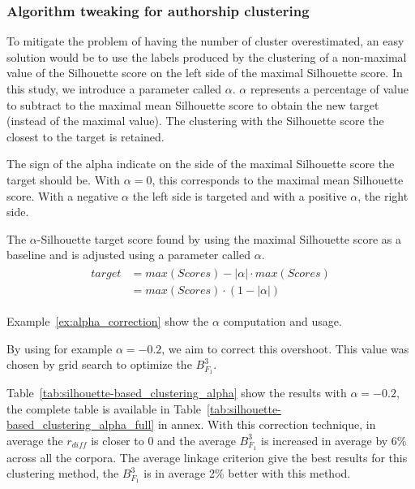 \subsubsection{Algorithm tweaking for authorship clustering}

To mitigate the problem of having the number of cluster overestimated, an easy solution would be to use the labels produced by the clustering of a non-maximal value of the Silhouette score on the left side of the maximal Silhouette score.
In this study, we introduce a parameter called $\alpha$.
$\alpha$ represents a percentage of value to subtract to the maximal mean Silhouette score to obtain the new target (instead of the maximal value).
The clustering with the Silhouette score the closest to the target is retained.

The sign of the alpha indicate on the side of the maximal Silhouette score the target should be.
With $\alpha = 0$, this corresponds to the maximal mean Silhouette score.
With a negative $\alpha$ the left side is targeted and with a positive $\alpha$, the right side.

\begin{definition}
  The $\alpha$-Silhouette target score found by using the maximal Silhouette score as a baseline and is adjusted using a parameter called $\alpha$.
  \begin{gather*}
    \begin{aligned}
    target &= max(Scores) - |\alpha| \cdot max(Scores) \\
           &= max(Scores) \cdot (1 - |\alpha|)
    \end{aligned}
  \end{gather*}
\end{definition}

Example~\ref{ex:alpha_correction} show the $\alpha$ computation and usage.

By using for example $\alpha = -0.2$, we aim to correct this overshoot.
This value was chosen by grid search to optimize the $B^3_{F_1}$.

Table~\ref{tab:silhouette-based_clustering_alpha} show the results with $\alpha = -0.2$, the complete table is available in Table~\ref{tab:silhouette-based_clustering_alpha_full} in annex.
With this correction technique, in average the $r_{diff}$ is closer to 0 and the average $B^3_{F_1}$ is increased in average by 6\% across all the corpora.
The average linkage criterion give the best results for this clustering method, the $B^3_{F_1}$ is in average 2\% better with this method.

